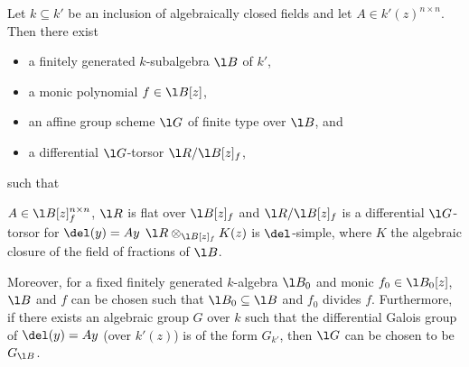 \documentclass[a4paper, 11pt]{article}
\begin{document}
\begin{lemma} \label{lem:spread}
	Let $k \subseteq k'$ be an inclusion of algebraically closed fields and let $A\in k'(z)^{n\times n}$. 
	 Then there exist
	
	\begin{itemize}
		\item [$\bullet$] a finitely generated $k$-subalgebra $\l B$ of $k'$,
		\item[$\bullet$] a monic polynomial $f \in \l B[z]$,
		\item[$\bullet$] an affine group scheme $\l G$ of finite type over $\l B$, and
		\item[$\bullet$] a differential $\l G$-torsor $\l R/\l B[z]_f$,
	\end{itemize}
	such that
	\begin{itemize}
		\ibul $A  \in \l B[z]_f^{n\times n}$,
		\ibul $\l R$ is flat over $\l B[z]_f$ and $\l R / \l B[z]_f$ is a differential $\l G$-torsor for $\del(y) = Ay$
		\ibul $\l R \otimes_{\l B[z]_f} K(z)$ is $\del$-simple, where $K$ the algebraic closure of the field of fractions of $\l B$.
	\end{itemize}
	Moreover, for a fixed finitely generated $k$-algebra $\l B_0$ and monic $f_0 \in \l B_0[z]$, $\l B$ and $f$ can be chosen such that $\l B_0 \subseteq \l B$ and $f_0 $ divides $f$.
	Furthermore, if there exists an algebraic group $G$ over $k$ such that the differential Galois group of $\del(y)=Ay$ (over $k'(z)$) is of the form $G_{k'}$, then $\l G$ can be chosen to be $G_{\l B}$.
\end{lemma}
\end{document}
